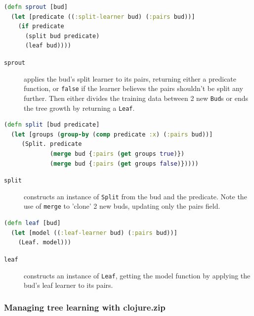 \documentclass[11pt,openany,american,usenames,dvipsnames,svgnames,x11names,table,isodate]{article}
\numberwithin{equation}{section}
\numberwithin{figure}{section}
\begin{document}
\begin{minipage}[t]{1\columnwidth}%
\begin{lstlisting}[caption={(sprout bud)},label={lis:sprout},language=clojure,tabsize=2]
(defn sprout [bud]
  (let [predicate ((:split-learner bud) (:pairs bud))]
    (if predicate
      (split bud predicate)
      (leaf bud))))
\end{lstlisting}
%
\end{minipage}
\begin{description}
\item [{\texttt{sprout}}] applies the bud's split learner to its pairs,
returning either a predicate function, or \texttt{false} if the learner
believes the pairs shouldn't be split any further. Then either divides
the training data between 2 new \texttt{Bud}s or ends the tree growth
by returning a \texttt{Leaf}.
\end{description}
\begin{minipage}[t]{1\columnwidth}%
\begin{lstlisting}[caption={(split bud)},label={lis:split},language=clojure,tabsize=2]
(defn split [bud predicate]
  (let [groups (group-by (comp predicate :x) (:pairs bud))]
     (Split. predicate
             (merge bud {:pairs (get groups true)})
             (merge bud {:pairs (get groups false)}))))
\end{lstlisting}
%
\end{minipage}
\begin{description}
\item [{\texttt{split}}] constructs an instance of \texttt{Split} from
the bud and the predicate. Note the use of \texttt{merge} to 'clone'
2 new buds, updating only the pairs field.
\end{description}
\begin{minipage}[t]{1\columnwidth}%
\begin{lstlisting}[caption={(leaf bud)},label={lis:leaf},language=clojure,tabsize=2]
(defn leaf [bud]
  (let [model ((:leaf-learner bud) (:pairs bud))]
    (Leaf. model)))
\end{lstlisting}
%
\end{minipage}
\begin{description}
\item [{\texttt{leaf}}] constructs an instance of \texttt{Leaf}, getting
the model function by applying the bud's leaf learner to its pairs.
\end{description}

\subsubsection{Managing tree learning with clojure.zip}
\end{document}
